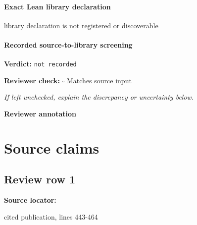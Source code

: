 \documentclass[10pt]{article}
\newcommand{\reviewerbox}{%
  \par\noindent\fbox{\parbox{0.96\linewidth}{\rule{0pt}{0.38in}}}\par
}
\newcommand{\reviewmatch}[1]{%
  \par\noindent\textbf{Reviewer check:} $\square$\; #1\par
  \noindent\emph{If left unchecked, explain the discrepancy or uncertainty below.}\par
}
\begin{document}
\paragraph{Exact Lean library declaration}
\begin{ReviewVerbatim}
library declaration is not registered or discoverable
\end{ReviewVerbatim}

\paragraph{Recorded source-to-library screening}
\textbf{Verdict:} \texttt{not recorded}
\reviewmatch{Matches source input}
\noindent\textbf{Reviewer annotation}\par
\reviewerbox

\clearpage
\hypertarget{source-claim-a906cbcbb07339a8}{}
\hypertarget{source-section-f10b5f68e4acf3dc}{}
\section*{Source claims}
\subsection*{Review row 1}
\textbf{Source locator:} {\footnotesize\raggedright cited publication, lines 443-\allowbreak{}464\par}
\end{document}
